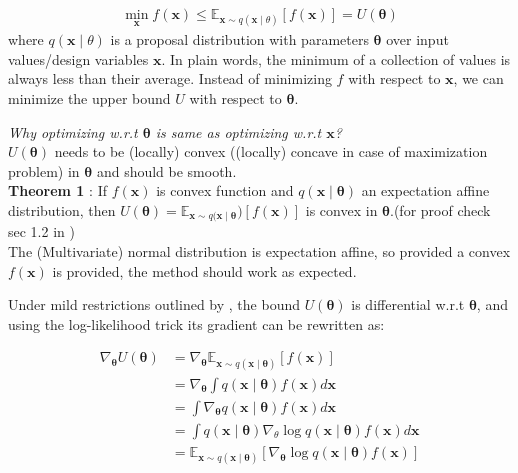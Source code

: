 \begin{itemize}
\begin{align}\label{eq:VO_main}
	\min _{\boldsymbol{x}} f(\boldsymbol{x}) \leq \mathbb{E}_{\boldsymbol{x} \sim q(\boldsymbol{x} \mid \theta)}[f(\boldsymbol{x})]=U(\boldsymbol{\theta})
\end{align}
where $q(\boldsymbol{x} \mid \theta)$ is a proposal distribution with parameters $\bm{\theta}$ over input values/design variables $\bm{x}$. In plain words, the minimum of a collection of values is always less than their average. Instead of minimizing $f$ with respect to $\bm{x}$, we can minimize the upper bound $U$ with respect to $\bm{\theta}$.

\begin{mdframed}[backgroundcolor=lightgray, linewidth =0pt]
	\emph{Why optimizing w.r.t $\bm{\theta}$ is same as optimizing w.r.t $\bm{x}$?}\\
	$U(\bm{\theta})$ needs to be (locally) convex ((locally) concave in case of maximization problem) in $\bm{\theta}$ and should be smooth.\\
	\textbf{Theorem 1} : If $f(\boldsymbol{x})$ is convex function and $q(\boldsymbol{x} \mid \bm{\theta})$ an expectation affine distribution, then $U(\bm{\theta}) = \mathbb{E}_{\boldsymbol{x} \sim q(\boldsymbol{x} \mid \bm{\theta}})[f(\boldsymbol{x})]$ is convex in $\bm{\theta}$.(for proof check sec 1.2 in \cite{staines_variational_2012})\\
	The (Multivariate) normal distribution is expectation affine, so provided a convex $f(\boldsymbol{x})$ is provided, the method should work as expected.
	
\end{mdframed}

Under mild restrictions outlined by \cite{staines_variational_2012}, the bound $U(\boldsymbol{ \theta})$ is differential w.r.t $\bm{\theta}$, and using the log-likelihood trick its gradient can be rewritten as:

\begin{align}\label{eq:grad_estimator}
	\nabla_{\boldsymbol{\theta}} U(\boldsymbol{\theta}) &=\nabla_{\boldsymbol{\theta}} \mathbb{E}_{\boldsymbol{x} \sim q(\boldsymbol{x} \mid \boldsymbol{\theta})}[f(\boldsymbol{x})] \nonumber \\
	&=\nabla_{\boldsymbol{\theta}} \int q(\boldsymbol{x} \mid \boldsymbol{\theta}) f(\boldsymbol{x}) d \boldsymbol{x} 
	\nonumber\\
	&=\int \nabla_{\boldsymbol{\theta}} q(\boldsymbol{x} \mid \boldsymbol{\theta}) f(\boldsymbol{x}) d \boldsymbol{x} 
	\nonumber \\
	&=\int q(\boldsymbol{x} \mid \boldsymbol{\theta}) \nabla_\theta \log q(\boldsymbol{x} \mid \boldsymbol{\theta}) f(\boldsymbol{x}) d \boldsymbol{x} 
	\nonumber \\
	&=\mathbb{E}_{\boldsymbol{x} \sim q(\boldsymbol{x} \mid \boldsymbol{\theta})}\left[\nabla_{\boldsymbol{\theta}} \log q(\boldsymbol{x} \mid \boldsymbol{\theta}) f(\boldsymbol{x})\right]
\end{align}


\end{itemize}
